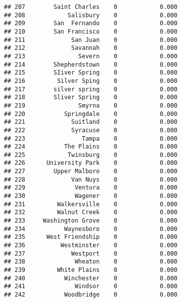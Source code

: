 \documentclass[]{article}
\newenvironment{Shaded}{\begin{snugshade}}{\end{snugshade}}
\newcommand{\KeywordTok}[1]{\textcolor[rgb]{0.13,0.29,0.53}{\textbf{#1}}}
\newcommand{\DataTypeTok}[1]{\textcolor[rgb]{0.13,0.29,0.53}{#1}}
\newcommand{\DecValTok}[1]{\textcolor[rgb]{0.00,0.00,0.81}{#1}}
\newcommand{\StringTok}[1]{\textcolor[rgb]{0.31,0.60,0.02}{#1}}
\newcommand{\OperatorTok}[1]{\textcolor[rgb]{0.81,0.36,0.00}{\textbf{#1}}}
\newcommand{\NormalTok}[1]{#1}
\begin{document}
\begin{verbatim}
## 207        Saint Charles    0            0.000
## 208            Salisbury    0            0.000
## 209        San  Fernando    0            0.000
## 210        San Francisco    0            0.000
## 211             San Juan    0            0.000
## 212             Savannah    0            0.000
## 213               Severn    0            0.000
## 214        Shepherdstown    0            0.000
## 215        SIiver Spring    0            0.000
## 216         Silver Sping    0            0.000
## 217        silver spring    0            0.000
## 218        Sliver Spring    0            0.000
## 219               Smyrna    0            0.000
## 220           Springdale    0            0.000
## 221             Suitland    0            0.000
## 222             Syracuse    0            0.000
## 223                Tampa    0            0.000
## 224           The Plains    0            0.000
## 225            Twinsburg    0            0.000
## 226      University Park    0            0.000
## 227        Upper Malboro    0            0.000
## 228             Van Nuys    0            0.000
## 229              Ventura    0            0.000
## 230              Wagener    0            0.000
## 231         Walkersville    0            0.000
## 232         Walnut Creek    0            0.000
## 233     Washington Grove    0            0.000
## 234           Waynesboro    0            0.000
## 235      West Friendship    0            0.000
## 236          Westminster    0            0.000
## 237             Westport    0            0.000
## 238              Wheaton    0            0.000
## 239         White Plains    0            0.000
## 240           Winchester    0            0.000
## 241              Windsor    0            0.000
## 242           Woodbridge    0            0.000
\end{verbatim}

\begin{Shaded}
\end{Shaded}
\end{document}
